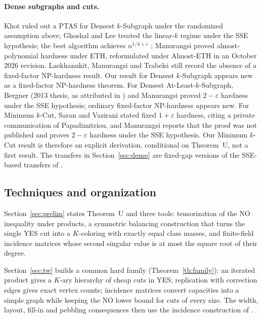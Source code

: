 \documentclass[11pt,letterpaper]{article}
\theoremstyle{definition}
\theoremstyle{remark}
\newcommand{\eps}{\varepsilon}
\begin{document}
\paragraph{Dense subgraphs and cuts.}
Khot \cite{kho06} ruled out a PTAS for Densest \(k\)-Subgraph under the
randomized assumption above; Ghoshal and Lee \cite{gl22} treated the
linear-\(k\) regime under the SSE hypothesis; the best algorithm achieves
\(n^{1/4+\eps}\) \cite{bccfv10}; Manurangsi \cite{man17} proved
almost-polynomial hardness under ETH, reformulated under Almost-ETH in an
October 2026 revision. Laekhanukit, Manurangsi and Trabelsi \cite{lmt26}
still record the absence of a fixed-factor NP-hardness result. Our result
for Densest \(k\)-Subgraph appears new as a fixed-factor NP-hardness theorem.
For Densest At-Least-\(k\)-Subgraph, Bergner (2013 thesis, as attributed in
\cite{man18}) and Manurangsi \cite{man18} proved \(2-\eps\) hardness under
the SSE hypothesis; ordinary fixed-factor NP-hardness appears new. For
Minimum \(k\)-Cut, Saran and Vazirani \cite{sv95} stated fixed
\(1+\eps\) hardness, citing a private communication of Papadimitriou, and
Manurangsi \cite{man18} reports that the proof was not published and proves
\(2-\eps\) hardness under the SSE hypothesis. Our Minimum \(k\)-Cut result is
therefore an explicit derivation, conditional on Theorem~U, not a first
result. The transfers in Section~\ref{sec:dense} are fixed-gap versions of
the SSE-based transfers of \cite{man18}.

\subsection{Techniques and organization}

Section~\ref{sec:prelim} states Theorem~U and three tools: tensorization of
the NO inequality under products, a symmetric balancing construction that
turns the single YES cut into a \(K\)-coloring with exactly equal class
masses, and finite-field incidence matrices whose second singular value is
at most the square root of their degree.

Section~\ref{sec:tw} builds a common hard family (Theorem~\ref{th:family}):
an iterated product gives a \(K\)-ary hierarchy of cheap cuts in YES;
replication with correction edges gives exact vertex counts; incidence
matrices convert capacities into a simple graph while keeping the NO lower
bound for cuts of every size. The width, layout, fill-in and pebbling
consequences then use the incidence construction of \cite{apw12,wapl14}.
\end{document}
